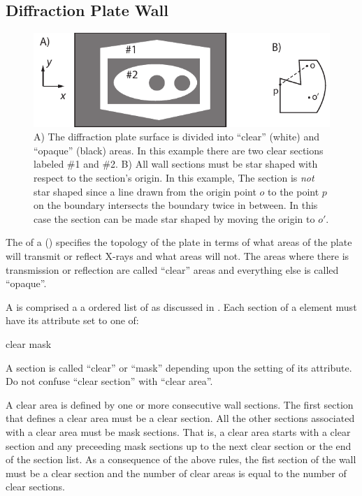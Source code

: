 \subsection{Diffraction Plate Wall}
\label{s:wall.diff.plate}

\begin{figure}[tb]
  \centering
  \includegraphics[width=5in]{diffraction-plate.pdf}
  \caption[Example diffraction_plate element]{
A) The diffraction plate surface is divided into ``clear'' (white) and
``opaque'' (black) areas. In this example there are two clear sections
labeled \#1 and \#2. B) All wall sections must be star shaped with
respect to the section's origin. In this example, The section is {\em
not} star shaped since a line drawn from the origin point $o$ to the
point $p$ on the boundary intersects the boundary twice in between. In
this case the section can be made star shaped by moving the origin to
$o'$.
  }
  \label{f:diff.plate}
\end{figure}

The  of a  ()
specifies the topology of the plate in terms of what areas of the
plate will transmit or reflect X-rays and what areas will not.  The
areas where there is transmission or reflection are called ``clear''
areas and everything else is called ``opaque''. 

A  is comprised a a ordered list of  as
discussed in . Each section of a
 element must have its  attribute set
to one of:
\begin{example}
  clear
  mask
\end{example}
A section is called ``clear'' or ``mask'' depending upon the setting
of its  attribute. Do not confuse ``clear section'' with 
``clear area''.

A clear area is defined by one or more consecutive wall sections. The
first section that defines a clear area must be a clear section.  All
the other sections associated with a clear area must be mask sections.
That is, a clear area starts with a clear section and any preceeding
mask sections up to the next clear section or the end of the section
list. As a consequence of the above rules, the fist section of the
wall must be a clear section and the number of clear areas is equal to
the number of clear sections.

